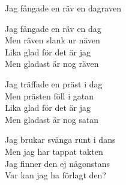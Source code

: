 \begin{song}{Jag fångade en räv en dag}{raven}
\begin{vers}
Jag fångade en räv en dag\\
Men räven slank ur näven\\
Lika glad för det är jag\\
Men gladast är nog räven\\
\end{vers}
\begin{vers}
Jag träffade en präst i dag\\
Men prästen föll i gatan\\
Lika glad för det är jag\\
Men gladast är nog satan\\
\end{vers}
\begin{vers}
Jag brukar svänga runt i dans\\
Men jag har tappat takten\\
Jag finner den ej någonstans\\
Var kan jag ha förlagt den?\\
\end{vers}
\end{song}
